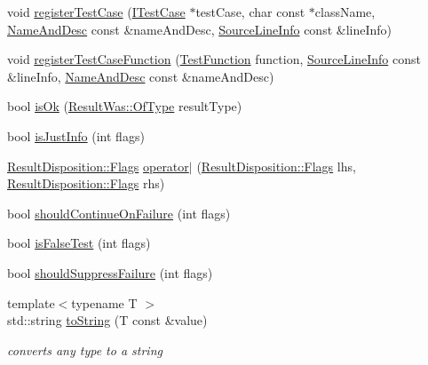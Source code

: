 \begin{DoxyCompactItemize}
\item 
void \hyperlink{namespace_catch_a9a59d681cc327a33c280796561dfe258}{register\+Test\+Case} (\hyperlink{struct_catch_1_1_i_test_case}{I\+Test\+Case} $\ast$test\+Case, char const $\ast$class\+Name, \hyperlink{struct_catch_1_1_name_and_desc}{Name\+And\+Desc} const \&name\+And\+Desc, \hyperlink{struct_catch_1_1_source_line_info}{Source\+Line\+Info} const \&line\+Info)
\item 
void \hyperlink{namespace_catch_a220159aeff47f9c5231e893f2abbc643}{register\+Test\+Case\+Function} (\hyperlink{namespace_catch_a26414f52d0835939fae52aadd27e6257}{Test\+Function} function, \hyperlink{struct_catch_1_1_source_line_info}{Source\+Line\+Info} const \&line\+Info, \hyperlink{struct_catch_1_1_name_and_desc}{Name\+And\+Desc} const \&name\+And\+Desc)
\item 
bool \hyperlink{namespace_catch_a5205869c81c06d3460759cb86676ae68}{is\+Ok} (\hyperlink{struct_catch_1_1_result_was_a624e1ee3661fcf6094ceef1f654601ef}{Result\+Was\+::\+Of\+Type} result\+Type)
\item 
bool \hyperlink{namespace_catch_a54b01af61673a3e1f21f31713639b180}{is\+Just\+Info} (int flags)
\item 
\hyperlink{struct_catch_1_1_result_disposition_a3396cad6e2259af326b3aae93e23e9d8}{Result\+Disposition\+::\+Flags} \hyperlink{namespace_catch_ab32a083e442cc09f736327d2e2865999}{operator$\vert$} (\hyperlink{struct_catch_1_1_result_disposition_a3396cad6e2259af326b3aae93e23e9d8}{Result\+Disposition\+::\+Flags} lhs, \hyperlink{struct_catch_1_1_result_disposition_a3396cad6e2259af326b3aae93e23e9d8}{Result\+Disposition\+::\+Flags} rhs)
\item 
bool \hyperlink{namespace_catch_a7f7480b15d74965459c844f0d393ed87}{should\+Continue\+On\+Failure} (int flags)
\item 
bool \hyperlink{namespace_catch_a93ef4e3e307a2021ca0d41b32c0e54b0}{is\+False\+Test} (int flags)
\item 
bool \hyperlink{namespace_catch_ab91eb13081203d634fe48d3d2ab386d7}{should\+Suppress\+Failure} (int flags)
\item 
{\footnotesize template$<$typename T $>$ }\\std\+::string \hyperlink{namespace_catch_adbd1730f961da94d9ed284f70fd7a28b}{to\+String} (T const  \&value)
\begin{DoxyCompactList}\small\item\em converts any type to a string \end{DoxyCompactList}\item 

\end{DoxyCompactItemize}

